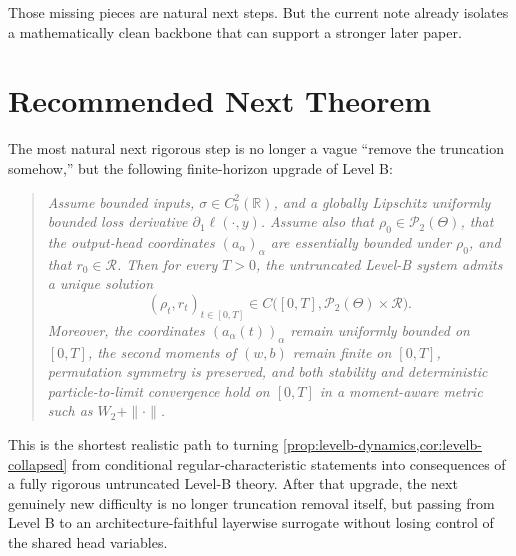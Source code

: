 \documentclass[11pt]{article}
\theoremstyle{definition}
\newcommand{\R}{\mathbb{R}}
\newcommand{\PP}{\mathcal{P}}
\begin{document}
Those missing pieces are natural next steps.
But the current note already isolates a mathematically clean backbone that can support a stronger later paper.

\section{Recommended Next Theorem}

The most natural next rigorous step is no longer a vague ``remove the truncation somehow,'' but the following finite-horizon upgrade of Level B:

\begin{quote}
\emph{Assume bounded inputs, $\sigma\in C_b^2(\R)$, and a globally Lipschitz uniformly bounded loss derivative $\partial_1\ell(\cdot,y)$.
Assume also that $\rho_0\in \PP_2(\Theta)$, that the output-head coordinates $(a_\alpha)_\alpha$ are essentially bounded under $\rho_0$, and that $r_0\in\mathcal R$.
Then for every $T>0$, the untruncated Level-B system admits a unique solution
\[
  (\rho_t,r_t)_{t\in[0,T]}
  \in
  C\bigl([0,T],\PP_2(\Theta)\times\mathcal R\bigr).
\]
Moreover, the coordinates $(a_\alpha(t))_\alpha$ remain uniformly bounded on $[0,T]$,
the second moments of $(w,b)$ remain finite on $[0,T]$,
permutation symmetry is preserved,
and both stability and deterministic particle-to-limit convergence hold on $[0,T]$ in a moment-aware metric such as $W_2+\|\cdot\|$.}
\end{quote}

This is the shortest realistic path to turning \cref{prop:levelb-dynamics,cor:levelb-collapsed}
from conditional regular-characteristic statements into consequences of a fully rigorous untruncated Level-B theory.
After that upgrade, the next genuinely new difficulty is no longer truncation removal itself,
but passing from Level B to an architecture-faithful layerwise surrogate without losing control of the shared head variables.
\end{document}

